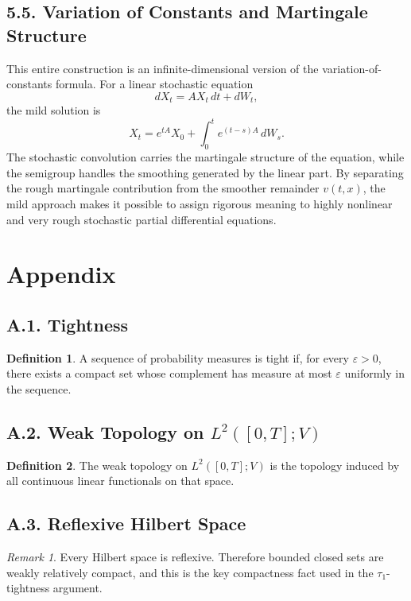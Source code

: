 \documentclass[11pt]{article}
\theoremstyle{definition}
\newtheorem{definition}{Definition}
\theoremstyle{remark}
\newtheorem{remark}{Remark}
\begin{document}
\subsection*{5.5. Variation of Constants and Martingale Structure}
This entire construction is an infinite-dimensional version of the variation-of-constants formula. For a linear stochastic equation
\[
dX_t=AX_t\,dt+dW_t,
\]
the mild solution is
\[
X_t=e^{tA}X_0+\int_0^t e^{(t-s)A}\,dW_s.
\]
The stochastic convolution carries the martingale structure of the equation, while the semigroup handles the smoothing generated by the linear part. By separating the rough martingale contribution from the smoother remainder \(v(t,x)\), the mild approach makes it possible to assign rigorous meaning to highly nonlinear and very rough stochastic partial differential equations.

\section*{Appendix}

\subsection*{A.1. Tightness}
\begin{definition}
A sequence of probability measures is tight if, for every \(\varepsilon>0\), there exists a compact set whose complement has measure at most \(\varepsilon\) uniformly in the sequence.
\end{definition}

\subsection*{A.2. Weak Topology on \(L^2([0,T];V)\)}
\begin{definition}
The weak topology on \(L^2([0,T];V)\) is the topology induced by all continuous linear functionals on that space.
\end{definition}

\subsection*{A.3. Reflexive Hilbert Space}
\begin{remark}
Every Hilbert space is reflexive. Therefore bounded closed sets are weakly relatively compact, and this is the key compactness fact used in the \(\tau_1\)-tightness argument.
\end{remark}
\end{document}
